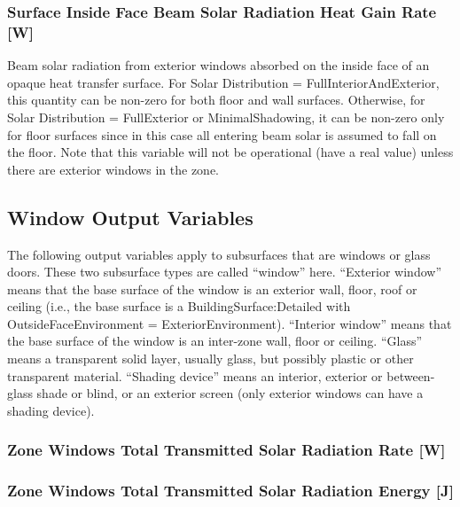 \subsubsection{Surface Inside Face Beam Solar Radiation Heat Gain Rate {[}W{]}}\label{surface-inside-face-beam-solar-radiation-heat-gain-rate-w}

Beam solar radiation from exterior windows absorbed on the inside face of an opaque heat transfer surface. For Solar Distribution = FullInteriorAndExterior, this quantity can be non-zero for both floor and wall surfaces. Otherwise, for Solar Distribution = FullExterior or MinimalShadowing, it can be non-zero only for floor surfaces since in this case all entering beam solar is assumed to fall on the floor. Note that this variable will not be operational (have a real value) unless there are exterior windows in the zone.

\subsection{Window Output Variables}\label{window-output-variables-1}

The following output variables apply to subsurfaces that are windows or glass doors. These two subsurface types are called ``window'' here. ``Exterior window'' means that the base surface of the window is an exterior wall, floor, roof or ceiling (i.e., the base surface is a BuildingSurface:Detailed with OutsideFaceEnvironment = ExteriorEnvironment). ``Interior window'' means that the base surface of the window is an inter-zone wall, floor or ceiling. ``Glass'' means a transparent solid layer, usually glass, but possibly plastic or other transparent material. ``Shading device'' means an interior, exterior or between-glass shade or blind, or an exterior screen (only exterior windows can have a shading device).

\subsubsection{Zone Windows Total Transmitted Solar Radiation Rate {[}W{]}}\label{zone-windows-total-transmitted-solar-radiation-rate-w}

\subsubsection{Zone Windows Total Transmitted Solar Radiation Energy {[}J{]}}\label{zone-windows-total-transmitted-solar-radiation-energy-j}

